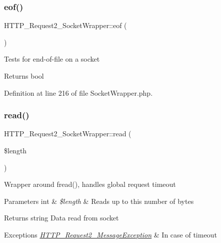 \subsubsection{\texorpdfstring{eof()}{eof()}}
{\footnotesize\ttfamily H\+T\+T\+P\+\_\+\+Request2\+\_\+\+Socket\+Wrapper\+::eof (\begin{DoxyParamCaption}{ }\end{DoxyParamCaption})}

Tests for end-\/of-\/file on a socket

\begin{DoxyReturn}{Returns}
bool 
\end{DoxyReturn}


Definition at line 216 of file Socket\+Wrapper.\+php.

\mbox{\label{classHTTP__Request2__SocketWrapper_a5e483244689fefacb4b774fde087c60d}} 
\subsubsection{\texorpdfstring{read()}{read()}}
{\footnotesize\ttfamily H\+T\+T\+P\+\_\+\+Request2\+\_\+\+Socket\+Wrapper\+::read (\begin{DoxyParamCaption}\item[{}]{\$length }\end{DoxyParamCaption})}

Wrapper around fread(), handles global request timeout


\begin{DoxyParams}[1]{Parameters}
int & {\em \$length} & Reads up to this number of bytes\\
\hline
\end{DoxyParams}
\begin{DoxyReturn}{Returns}
string Data read from socket 
\end{DoxyReturn}

\begin{DoxyExceptions}{Exceptions}
{\em \hyperlink{classHTTP__Request2__MessageException}{H\+T\+T\+P\+\_\+\+Request2\+\_\+\+Message\+Exception}} & In case of timeout \\
\hline
\end{DoxyExceptions}



